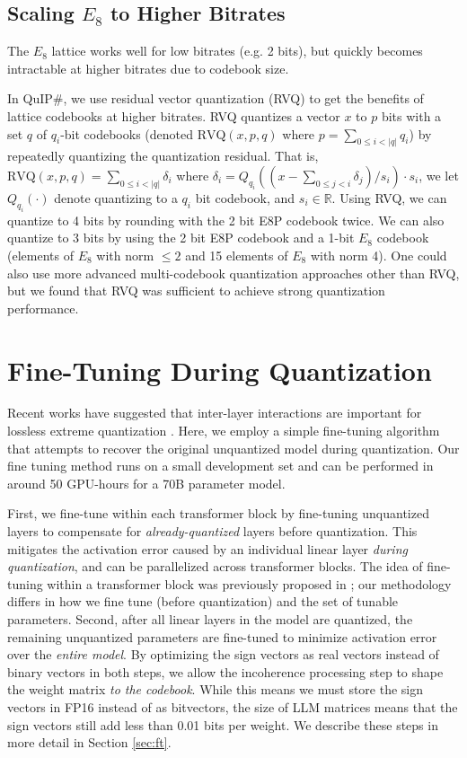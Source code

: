 \subsection{Scaling $E_8$ to Higher Bitrates}

The $E_8$ lattice works well for low bitrates (e.g. 2 bits), but quickly becomes intractable at higher bitrates due to codebook size.

In QuIP$\#$, we use residual vector quantization (RVQ) \cite{rvq} to get the benefits of lattice codebooks at higher bitrates. RVQ quantizes a vector $x$ to $p$ bits with a set $q$ of $q_i$-bit codebooks (denoted $\mbox{RVQ}(x, p, q)$ where $p = \sum_{0 \le i < |q|} q_i$) by repeatedly quantizing the quantization residual. That is, $\mbox{RVQ}(x, p, q) = \sum_{0 \le i < |q|} \delta_i$ where $\delta_i = Q_{q_i}\left((x - \sum_{0 \le j < i}\delta_j) / s_i \right) \cdot s_i$, we let $Q_{q_i}(\cdot)$ denote quantizing to a $q_i$ bit codebook, and $s_i \in \mathbb{R}$.
Using RVQ, we can quantize to 4 bits by rounding with the 2 bit E8P codebook twice. We can also quantize to 3 bits by using the 2 bit E8P codebook and a 1-bit $E_8$ codebook (elements of $E_8$ with norm $\le 2$ and 15 elements of $E_8$ with norm 4). One could also use more advanced multi-codebook quantization approaches other than RVQ, but we found that RVQ was sufficient to achieve strong quantization performance.

\section{Fine-Tuning During Quantization}
\label{sec:ftorig}
Recent works have suggested that inter-layer interactions are important for lossless extreme quantization \cite{omniquant, aqlm}. Here, we employ a simple fine-tuning algorithm that attempts to recover the original unquantized model during quantization. Our fine tuning method runs on a small development set and can be performed in around 50 GPU-hours for a 70B parameter model.

First, we fine-tune within each transformer block by fine-tuning unquantized layers to compensate for \textit{already-quantized} layers before quantization. This mitigates the activation error caused by an individual linear layer \textit{during quantization}, and can be parallelized across transformer blocks. The idea of fine-tuning within a transformer block was previously proposed in \citet{aqlm}; our methodology differs in how we fine tune (before quantization) and the set of tunable parameters. Second, after all linear layers in the model are quantized, the remaining unquantized parameters are fine-tuned to minimize activation error over the \textit{entire model}. By optimizing the sign vectors as real vectors instead of binary vectors in both steps, we allow the incoherence processing step to shape the weight matrix \textit{to the codebook}. While this means we must store the sign vectors in FP16 instead of as bitvectors, the size of LLM matrices means that the sign vectors still add less than 0.01 bits per weight. We describe these steps in more detail in Section \ref{sec:ft}.


